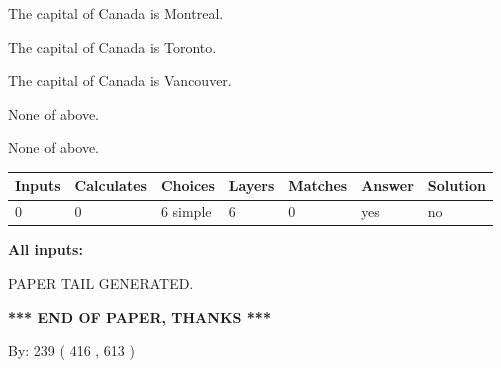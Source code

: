 \documentclass[12pt]{article}
\begin{document}
 
The capital of Canada is Montreal.
 
 
The capital of Canada is Toronto.
 
 
The capital of Canada is Vancouver.
 
 
 None of above.
 
 
\noindent{}
 
 
 None of above.
 
 
\noindent{}
 
 
   
   
   
   
\noindent\begin{tabular}{|l|l|l|l|l|l|l|}
 \hline
Inputs & Calculates & Choices & Layers & Matches & Answer & Solution \\ \hline
 0  & 
 0  & 
 6
  simple  
  & 
 6  & 
 0  & 
  yes & 
  no 
  \\ \hline
 \end{tabular}
   
   
   
   
\noindent{}
   
   
   
   
\noindent\vspace{0.1in}\hspace{-0.08in} {\textbf{\Large{All inputs: }}}
   
   
   
   
   
   
 \vspace{0.2in}
 
   
   
\vspace{2.0in} PAPER TAIL GENERATED.
   
   
   
   
\vspace{1.0in} 
{\textbf{\large{ *** END OF PAPER, THANKS *** }}} 
   
   
\hspace{1.0in} By: 
 239 ( 416 ,  613 )
   
   
   
   
\newpage 
\setcounter{page}{ 
   532001 } 
   
\end{document}
